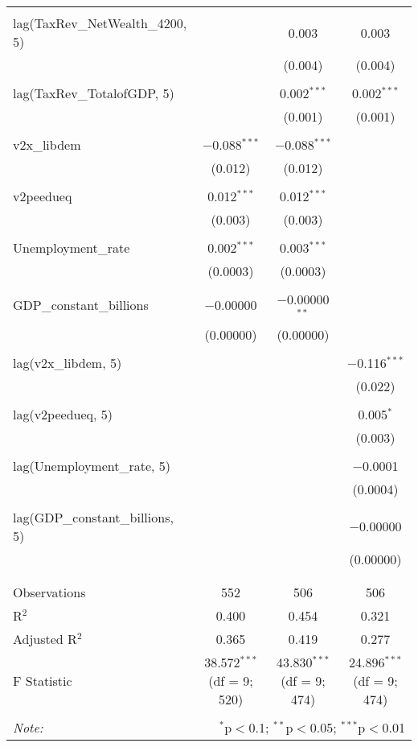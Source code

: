 \begin{table}[!htbp]
\begin{tabular}{@{\extracolsep{5pt}}lccc}
  & & & \\ 
 lag(TaxRev\_NetWealth\_4200, 5) &  & 0.003 & 0.003 \\ 
  &  & (0.004) & (0.004) \\ 
  & & & \\ 
 lag(TaxRev\_TotalofGDP, 5) &  & 0.002$^{***}$ & 0.002$^{***}$ \\ 
  &  & (0.001) & (0.001) \\ 
  & & & \\ 
 v2x\_libdem & $-$0.088$^{***}$ & $-$0.088$^{***}$ &  \\ 
  & (0.012) & (0.012) &  \\ 
  & & & \\ 
 v2peedueq & 0.012$^{***}$ & 0.012$^{***}$ &  \\ 
  & (0.003) & (0.003) &  \\ 
  & & & \\ 
 Unemployment\_rate & 0.002$^{***}$ & 0.003$^{***}$ &  \\ 
  & (0.0003) & (0.0003) &  \\ 
  & & & \\ 
 GDP\_constant\_billions & $-$0.00000 & $-$0.00000$^{**}$ &  \\ 
  & (0.00000) & (0.00000) &  \\ 
  & & & \\ 
 lag(v2x\_libdem, 5) &  &  & $-$0.116$^{***}$ \\ 
  &  &  & (0.022) \\ 
  & & & \\ 
 lag(v2peedueq, 5) &  &  & 0.005$^{*}$ \\ 
  &  &  & (0.003) \\ 
  & & & \\ 
 lag(Unemployment\_rate, 5) &  &  & $-$0.0001 \\ 
  &  &  & (0.0004) \\ 
  & & & \\ 
 lag(GDP\_constant\_billions, 5) &  &  & $-$0.00000 \\ 
  &  &  & (0.00000) \\ 
  & & & \\ 
\hline \\[-1.8ex] 
Observations & 552 & 506 & 506 \\ 
R$^{2}$ & 0.400 & 0.454 & 0.321 \\ 
Adjusted R$^{2}$ & 0.365 & 0.419 & 0.277 \\ 
F Statistic & 38.572$^{***}$ (df = 9; 520) & 43.830$^{***}$ (df = 9; 474) & 24.896$^{***}$ (df = 9; 474) \\ 
\hline 
\hline \\[-1.8ex] 
\textit{Note:}  & \multicolumn{3}{r}{$^{*}$p$<$0.1; $^{**}$p$<$0.05; $^{***}$p$<$0.01} \\ 
\end{tabular} 
\end{table} 
